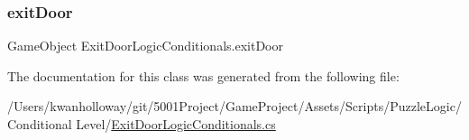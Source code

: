\subsubsection{\texorpdfstring{exit\+Door}{exitDoor}}
{\footnotesize\ttfamily Game\+Object Exit\+Door\+Logic\+Conditionals.\+exit\+Door}



The documentation for this class was generated from the following file\+:\begin{DoxyCompactItemize}
\item 
/\+Users/kwanholloway/git/5001\+Project/\+Game\+Project/\+Assets/\+Scripts/\+Puzzle\+Logic/\+Conditional Level/\hyperlink{_exit_door_logic_conditionals_8cs}{Exit\+Door\+Logic\+Conditionals.\+cs}\end{DoxyCompactItemize}
